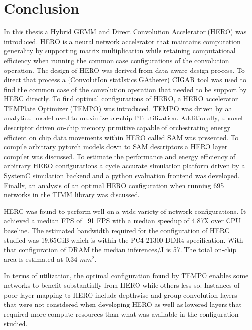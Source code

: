 \chapter{Conclusion}
\label{chap:conclude}

In this thesis a Hybrid GEMM and Direct Convolution Accelerator (HERO) was
introduced. HERO is a neural network accelerator that maintains computation
generality by supporting matrix multiplication while retaining computational
efficiency when running the common case configurations of the convolution
operation. The design of HERO was derived from data aware design process. To
direct that process a (ConvolutIon statIstics GAtherer) \ac{CIGAR} tool was used
to find the common case of the convolution operation that needed to be support
by HERO directly. To find optimal configurations of HERO, a HERO accelerator
TEMPlate Optimizer (TEMPO) was introduced. TEMPO was driven by an analytical
model used to maximize on-chip PE utilization. Additionally, a novel descriptor
driven on-chip memory primitive capable of orchestrating energy efficient on
chip data movements within \ac{HERO} called SAM was presented. To compile arbitrary pytorch
models down to SAM descriptors a HERO layer compiler was discussed. To estimate
the performance and energy efficiency of arbitrary HERO configurations a cycle
accurate simulation platform driven by a SystemC simulation backend and a python
evaluation frontend was developed. Finally, an analysis of an optimal HERO
configuration when running 695 networks in the TIMM library was discussed.

HERO was found to perform well on a wide variety of network configurations. It
achieved a median FPS of ~91 FPS with a median speedup of 4.87X over CPU
baseline. The estimated bandwidth required for the configuration of HERO studied
was 19.65GiB which is within the PC4-21300 DDR4 specification. With that
configuration of DRAM the median inferences/J is 57. The total on-chip area is
estimated at 0.34 $mm^2$. 

In terms of utilization, the optimal configuration found by TEMPO enables some
networks to benefit substantially from HERO while others less so. Instances of
poor layer mapping to HERO include depthwise and group convolution layers that
were not considered when developing HERO as well as lowered layers that required more
compute resources than what was available in the configuration studied. 

